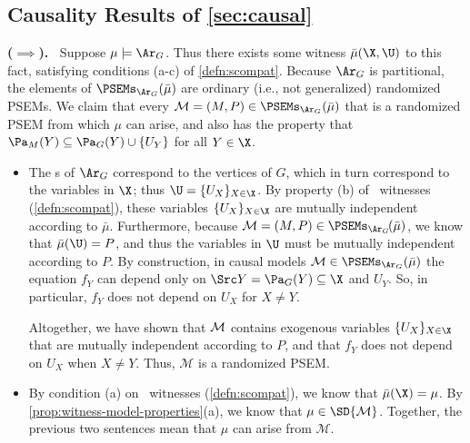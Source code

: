 \begin{subappendices}
\subsection{Causality Results of \cref{sec:causal}}
\begin{lproof}\label{proof:sc-graph-arise}
    \textbf{($\implies$).~} Suppose $\mu \models \Ar_G$. 
    Thus there exists some witness $\bar\mu(\X,\U)$ to this fact, satisfying conditions (a-c) of \cref{defn:scompat}. 
    Because $\Ar_G$ is partitional, the elements
    of $\PSEMs_{\Ar_G}(\bar\mu)$ are ordinary (i.e., not generalized) randomized PSEMs.
    We claim that every $\mathcal M = (M,P) \in \PSEMs_{\Ar_G}(\bar\mu)$ that is a randomized PSEM from which $\mu$ can arise,
    and also has the property that $\Pa_M(Y) \subseteq \Pa_G(Y) \cup \{U_Y\}$ for all $Y \in \X$. 
    \begin{itemize}[left=1em]
    \item 
    The \hyperarc s of $\Ar_G$ correspond to the vertices of $G$, which in turn correspond to the variables in $\X$; thus $\U = \{ U_X \}_{X \in \X}$. 
    By property (b) of \scibility\ witnesses (\cref{defn:scompat}), these variables $\{ U_X \}_{X \in \X}$ are mutually independent according to $\bar\mu$. 
    Furthermore, because $\mathcal M = (M, P) \in \PSEMs_{\Ar_{G}\!}(\bar\mu)$, we know that $\bar\mu(\U) = P$, 
    and thus the variables in $\U$ must be mutually independent according to $P$.
    By construction, in causal models $\mathcal M \in \PSEMs_{\Ar_G}(\bar\mu)$ the equation $f_Y$ can depend only on $\Src Y = \Pa_G(Y) \subseteq \X$ and $U_Y$. So, in particular, $f_Y$ does not depend on $U_X$ for $X \ne Y$.
    
    Altogether, we have shown that ${\cal M}$ contains exogenous variables $\{ U_X \}_{X \in \X}$ that are mutually independent according to $P$, and that $f_Y$ does not depend on $U_X$ when $X \ne Y$. 
    Thus, $\mathcal M$ is a randomized PSEM.

    \item 
    By condition (a) on \scibility\ witnesses (\cref{defn:scompat}), we know that $\bar\mu(\X) = \mu$. By \cref{prop:witness-model-properties}(a), we know that $\mu \in \SD{\cal M}$. 
    Together, the previous two sentences mean that $\mu$ can arise from $\mathcal M$.
    

\end{itemize}
\end{lproof}
\end{subappendices}
